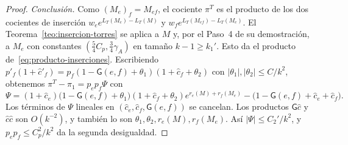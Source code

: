 \begin{proof}
\emph{Conclusión.} Como $(M_e)_f=M_{ef}$, el cociente $\pi^T$ es el producto de los dos cocientes de
inserción $w_ee^{L_T(M_e)-L_T(M)}$ y $w_fe^{L_T(M_{ef})-L_T(M_e)}$. El
Teorema~\ref{teo:insercion-torres} se aplica a $M$ y, por el Paso~4 de su demostración, a $M_e$ con
constantes $(\tfrac54C_p,\tfrac34\gamma_A)$ en tamaño $k-1\ge k_1'$. Esto da el producto
de~\eqref{eq:producto-inserciones}. Escribiendo
$p'_f(1+\hat c'_f)=p_f(1-\mathsf G(e,f)+\theta_1)(1+\hat c_f+\theta_2)$ con
$|\theta_1|,|\theta_2|\le C/k^2$, obtenemos $\pi^T-\pi_1=p_ep_f\Psi$ con
\begin{equation}\label{eq:psi-dos-casillas}
 \Psi=(1+\hat c_e)\bigl(1-\mathsf G(e,f)+\theta_1\bigr)(1+\hat c_f+\theta_2)e^{r_e(M)+r_f(M_e)}
      -\bigl(1-\mathsf G(e,f)+\hat c_e+\hat c_f\bigr).
\end{equation}
Los términos de $\Psi$ lineales en $(\hat c_e,\hat c_f,\mathsf G(e,f))$ se cancelan. Los productos
$\mathsf G\hat c$ y $\hat c\hat c$ son $O(k^{-2})$, y también lo son $\theta_1,\theta_2,r_e(M),r_f(M_e)$.
Así $|\Psi|\le C_2'/k^2$, y $p_ep_f\le C_p^2/k^2$ da la segunda desigualdad.
\end{proof}
